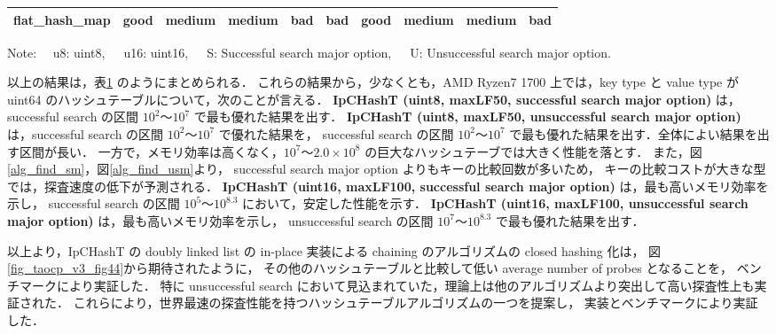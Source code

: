 \begin{table}
\begin{center}
\begin{tabular}{c|c|ccc|ccc|c|c}
        flat\_hash\_map        & \cellcolor{cGood}good   & \cellcolor{cMedi}medium & \cellcolor{cMedi}medium & \cellcolor{cBad }bad    & \cellcolor{cBad }bad    & \cellcolor{cGood}good   & \cellcolor{cMedi}medium  & \cellcolor{cMedi}medium & \cellcolor{cBad }bad  \rule[0pt]{0pt}{15pt} \\ \hline
    \end{tabular}
    Note: \ \ u8: uint8,\ \ \ u16: uint16,\ \ \ S: Successful search major option,\ \ \ U: Unsuccessful search major option.
    \label{table_hashT_cmp}
  \end{center}
\end{table}

以上の結果は，表\ref{table_hashT_cmp} のようにまとめられる．
これらの結果から，少なくとも，AMD Ryzen7 1700 上では，key type と value type が uint64 のハッシュテーブルについて，次のことが言える．
{\bf IpCHashT (uint8, maxLF50, successful search major option)} は，successful search の区間 $10^2〜10^7$ で最も優れた結果を出す．
{\bf IpCHashT (uint8, maxLF50, unsuccessful search major option)} は，successful search の区間 $10^2〜10^7$ で優れた結果を，
successful search の区間 $10^2〜10^7$ で最も優れた結果を出す．全体によい結果を出す区間が長い．
一方で，メモリ効率は高くなく，$10^7〜2.0\times10^8$ の巨大なハッシュテーブでは大きく性能を落とす．
また，図\ref{alg_find_sm}，図\ref{alg_find_usm}より，
successful search major option よりもキーの比較回数が多いため，
キーの比較コストが大きな型では，探査速度の低下が予測される．
{\bf IpCHashT (uint16, maxLF100, successful search major option)} は，最も高いメモリ効率を示し，
successful search の区間 $10^5〜10^{8.3}$ において，安定した性能を示す．
{\bf IpCHashT (uint16, maxLF100, unsuccessful search major option)} は，最も高いメモリ効率を示し，
unsuccessful search の区間 $10^7〜10^{8.3}$ で最も優れた結果を出す．

以上より，IpCHashT の doubly linked list の in-place 実装による chaining のアルゴリズムの closed hashing 化は，
図\ref{fig_taocp_v3_fig44}から期待されたように，
その他のハッシュテーブルと比較して低い average number of probes となることを，
ベンチマークにより実証した．
特に unsuccessful search において見込まれていた，理論上は他のアルゴリズムより突出して高い探査性上も実証された．
これらにより，世界最速の探査性能を持つハッシュテーブルアルゴリズムの一つを提案し，
実装とベンチマークにより実証した．

